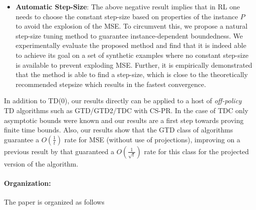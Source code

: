 \begin{itemize}[leftmargin=*]
\item \textbf{Automatic Step-Size}: 
The above negative result implies that in RL one needs to choose the constant step-size based on properties of the instance $P$ to avoid the explosion of the MSE.
To circumvent this, we propose a natural step-size tuning method to guarantee instance-dependent boundedness.
We experimentally evaluate the proposed method and find that it is indeed able to achieve its goal on a set of synthetic examples
where no constant step-size is available to prevent exploding MSE. Further, it is empirically demonstrated that the method is able to find a step-size, which is close to the theoretically recommended stepsize which results in the fastest convergence. 
\end{itemize}
In addition to TD($0$), our results directly can be applied to a host of \emph{off-policy} TD algorithms such as GTD/GTD2/TDC with CS-PR. 
In the case of TDC only asymptotic bounds were known \cite{gtd2} and our results are a first step 
 towards proving finite time bounds. Also, our results show that the GTD class of algorithms guarantee a $O(\frac{1}{t})$ rate for MSE (without use of projections), improving on a previous result by \citet{gtdmp} that guaranteed a $O(\frac{1}{\sqrt{t}})$ rate for this class for the projected version of the algorithm. 
\paragraph{Organization:} The paper is organized as follows 
